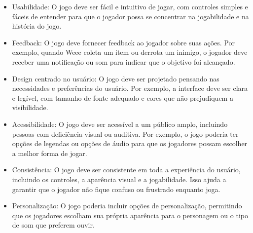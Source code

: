 \begin{itemize}
    \item Usabilidade: O jogo deve ser fácil e intuitivo de jogar, com controles simples e fáceis de entender para que o jogador possa se concentrar na jogabilidade e na história do jogo.

    \item Feedback: O jogo deve fornecer feedback ao jogador sobre suas ações. Por exemplo, quando Weee coleta um item ou derrota um inimigo, o jogador deve receber uma notificação ou som para indicar que o objetivo foi alcançado.

    \item Design centrado no usuário: O jogo deve ser projetado pensando nas necessidades e preferências do usuário. Por exemplo, a interface deve ser clara e legível, com tamanho de fonte adequado e cores que não prejudiquem a visibilidade.

    \item Acessibilidade: O jogo deve ser acessível a um público amplo, incluindo pessoas com deficiência visual ou auditiva. Por exemplo, o jogo poderia ter opções de legendas ou opções de áudio para que os jogadores possam escolher a melhor forma de jogar.

    \item Consistência: O jogo deve ser consistente em toda a experiência do usuário, incluindo os controles, a aparência visual e a jogabilidade. Isso ajuda a garantir que o jogador não fique confuso ou frustrado enquanto joga.

    \item Personalização: O jogo poderia incluir opções de personalização, permitindo que os jogadores escolham sua própria aparência para o personagem ou o tipo de som que preferem ouvir.
\end{itemize}

